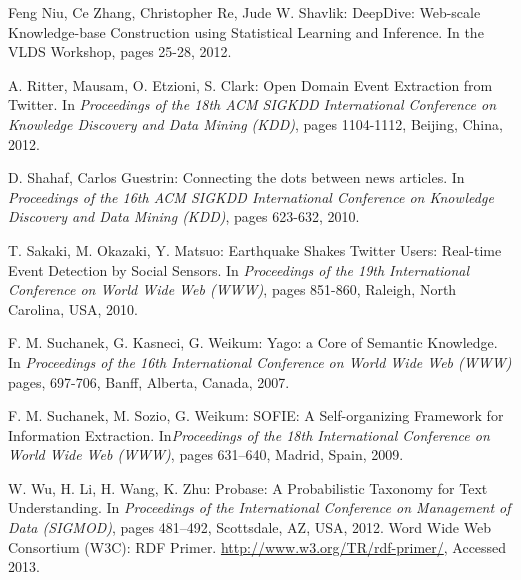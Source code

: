 \documentclass[11pt,a4paper]{article}
\begin{document}
\begin{thebibliography}{99}
 Feng Niu, Ce Zhang, Christopher Re, Jude W. Shavlik: DeepDive: Web-scale Knowledge-base Construction using Statistical Learning and Inference. In  the VLDS Workshop, pages 25-28, 2012.


 A. Ritter, Mausam, O. Etzioni, S. Clark: Open Domain Event Extraction from Twitter.  In \textit{Proceedings of the 18th ACM SIGKDD International Conference on Knowledge
               Discovery and Data Mining (KDD)}, pages 1104-1112, Beijing, China, 2012.
               
  D. Shahaf, Carlos Guestrin: Connecting the dots between news articles.  In \textit{Proceedings of the 16th ACM SIGKDD International Conference on Knowledge
Discovery and Data Mining (KDD)}, pages 623-632, 2010.

  T. Sakaki, M. Okazaki, Y.  Matsuo: Earthquake Shakes Twitter Users: Real-time Event Detection by Social Sensors.  In \textit{Proceedings  of the 19th International Conference
 on World Wide Web (WWW)}, pages 851-860, Raleigh, North Carolina, USA, 2010.
 
 F. M. Suchanek, G. Kasneci, G. Weikum: Yago: a Core of Semantic Knowledge. In \textit{Proceedings  of the 16th International Conference
 on World Wide Web (WWW)} pages, 697-706,  Banff, Alberta, Canada, 2007.

 F. M. Suchanek, M. Sozio, G. Weikum: SOFIE: A Self-organizing Framework for Information Extraction. In\textit{Proceedings  of the 18th International Conference
on World Wide Web (WWW)}, pages 631--640, Madrid, Spain, 2009.
  
%  
%
%
 W. Wu, H. Li, H. Wang, K. Zhu:
Probase: A Probabilistic Taxonomy for Text Understanding. In \textit{Proceedings of the International Conference on Management of Data (SIGMOD)}, pages 481--492, Scottsdale, AZ, USA, 2012.
 Word Wide Web Consortium (W3C): RDF Primer. \url{http://www.w3.org/TR/rdf-primer/}, Accessed  2013.


\end{thebibliography}
\end{document}
